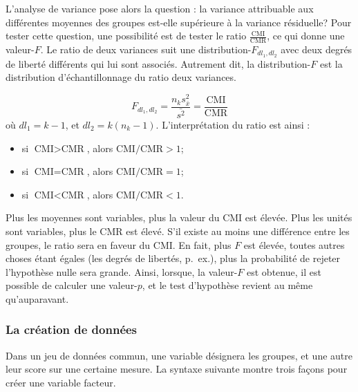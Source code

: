 \documentclass[
]{book}
\providecommand{\tightlist}{%
  \setlength{\itemsep}{0pt}\setlength{\parskip}{0pt}}
\begin{document}
L'analyse de variance pose alors la question : la variance attribuable aux différentes moyennes des groupes est-elle supérieure à la variance résiduelle? Pour tester cette question, une possibilité est de tester le ratio \(\frac{\text{CMI}}{\text{CMR}}\), ce qui donne une valeur-\(F\). Le ratio de deux variances suit une distribution-\(F_{dl_1, dl_2}\) avec deux degrés de liberté différents qui lui sont associés. Autrement dit, la distribution-\(F\) est la distribution d'échantillonnage du ratio deux variances.

\[F_{dl_1,dl_2} = \frac{n_ks^2_{\bar{x}}}{\bar{s^2}} = \frac{\text{CMI}}{\text{CMR}}\]
où \(dl_1 = k-1\), et \(dl_2 = k(n_k-1)\). L'interprétation du ratio est ainsi :

\begin{itemize}
\tightlist
\item
  si \(\text{CMI}>\text{CMR}\), alors \(\text{CMI}/\text{CMR}>1\);
\item
  si \(\text{CMI}=\text{CMR}\), alors \(\text{CMI}/\text{CMR}=1\);
\item
  si \(\text{CMI}<\text{CMR}\), alors \(\text{CMI}/\text{CMR}<1\).
\end{itemize}

Plus les moyennes sont variables, plus la valeur du CMI est élevée. Plus les unités sont variables, plus le CMR est élevé. S'il existe au moins une différence entre les groupes, le ratio sera en faveur du CMI. En fait, plus \(F\) est élevée, toutes autres choses étant égales (les degrés de libertés, p.~ex.), plus la probabilité de rejeter l'hypothèse nulle sera grande. Ainsi, lorsque, la valeur-\(F\) est obtenue, il est possible de calculer une valeur-\(p\), et le test d'hypothèse revient au même qu'auparavant.

\hypertarget{la-cruxe9ation-de-donnuxe9es}{%
\subsubsection{La création de données}\label{la-cruxe9ation-de-donnuxe9es}}

Dans un jeu de données commun, une variable désignera les groupes, et une autre leur score sur une certaine mesure. La syntaxe suivante montre trois façons pour créer une variable facteur.
\end{document}
